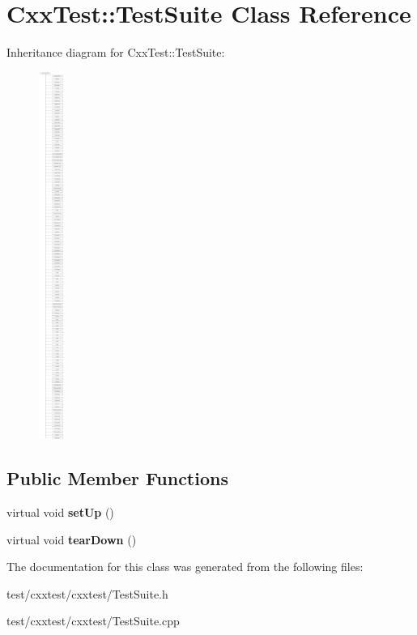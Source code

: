 \hypertarget{classCxxTest_1_1TestSuite}{\section{Cxx\-Test\-:\-:Test\-Suite Class Reference}
\label{classCxxTest_1_1TestSuite}
}
Inheritance diagram for Cxx\-Test\-:\-:Test\-Suite\-:\begin{figure}[H]
\begin{center}
\leavevmode
\includegraphics[height=12.000000cm]{classCxxTest_1_1TestSuite}
\end{center}
\end{figure}
\subsection*{Public Member Functions}
\begin{DoxyCompactItemize}
\item 
\hypertarget{classCxxTest_1_1TestSuite_a03e7e9428316d10a22d44d20811192fb}{virtual void {\bfseries set\-Up} ()}\label{classCxxTest_1_1TestSuite_a03e7e9428316d10a22d44d20811192fb}

\item 
\hypertarget{classCxxTest_1_1TestSuite_aa871c96da869344962b1435b72bcea13}{virtual void {\bfseries tear\-Down} ()}\label{classCxxTest_1_1TestSuite_aa871c96da869344962b1435b72bcea13}

\end{DoxyCompactItemize}


The documentation for this class was generated from the following files\-:\begin{DoxyCompactItemize}
\item 
test/cxxtest/cxxtest/Test\-Suite.\-h\item 
test/cxxtest/cxxtest/Test\-Suite.\-cpp\end{DoxyCompactItemize}
